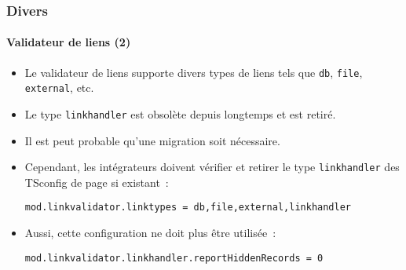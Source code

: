 %

\begin{frame}[fragile]
	\frametitle{Divers}
	\framesubtitle{Validateur de liens (2)}


	\begin{itemize}
		\item Le validateur de liens supporte divers types de liens tels que
			\small\texttt{db}\normalsize, \small\texttt{file}\normalsize,
			\small\texttt{external}\normalsize, etc.
		\item Le type \small\texttt{linkhandler}\normalsize
			est obsolète depuis longtemps et est retiré.
		\item Il est peut probable qu'une migration soit nécessaire.
		\item Cependant, les intégrateurs doivent vérifier et retirer le type \texttt{linkhandler}
			des TSconfig de page si existant~:
\begin{lstlisting}
mod.linkvalidator.linktypes = db,file,external,linkhandler
\end{lstlisting}

		\item Aussi, cette configuration ne doit plus être utilisée~:
\begin{lstlisting}
mod.linkvalidator.linkhandler.reportHiddenRecords = 0
\end{lstlisting}

	\end{itemize}

\end{frame}

